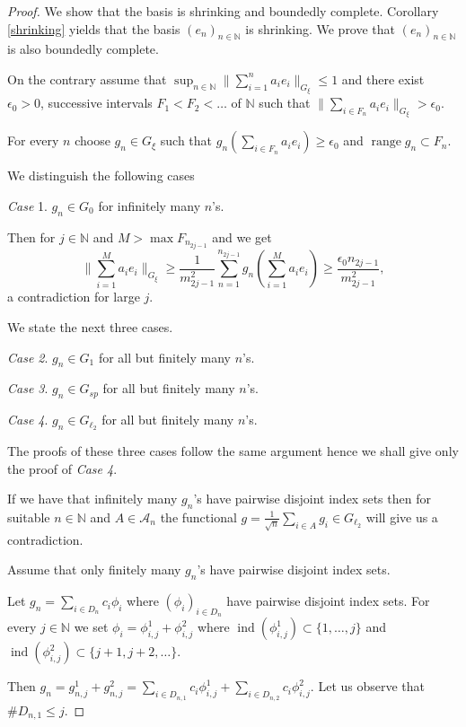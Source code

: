 \documentclass[a4paper]{amsart}
\theoremstyle{plain}
\newcommand{\N}{\mathbb{N}}
\newcommand{\mc}{\mathcal}
\newcommand{\e}{\epsilon}
\newcommand{\norm}[1][\cdot]{\lVert #1\rVert}
\DeclareMathOperator{\ran}{range}
\DeclareMathOperator{\ind}{ind}
\begin{document}
\begin{proof}
We show that the basis is shrinking and boundedly complete.
Corollary \ref{shrinking} yields that the basis $(e_{n})_{n\in\N}$
is shrinking. We  prove that $(e_{n})_{n\in\N}$  is also
boundedly complete.


On the contrary assume that
$\sup_{n\in\N}\norm[\sum_{i=1}^{n}a_{i}e_{i}]_{G_\xi}\leq 1$ and there exist $\e_0>0$,
successive intervals $F_{1}<F_{2}<\dots$ of   $\N$ such that  $\norm[\sum_{i\in
F_{n}}a_{i}e_{i}]_{G_\xi}> \e_0$.

For every $n$ choose $g_{n}\in G_{\xi}$ such that  $g_{n}(\sum_{i\in
F_{n}}a_{i}e_{i})\geq \e_0$ and  $\ran g_{n}\subset F_{n}$.

We distinguish the following cases

\textit{Case} 1. $g_{n}\in G_0$ for infinitely many $n$'s.

Then  for $j\in\N$ and $M>\max F_{n_{2j-1}}$ and  we get
$$
\|\sum_{i=1}^{M}a_{i}e_{i}\|_{G_\xi}\geq\frac{1}{m_{2j-1}^2}\sum_{n=1}^{n_{2j-1}}g_{n}(\sum_{i=1}^{M}a_{i}e_{i})\geq
\frac{\e_0 n_{2j-1}}{m^2_{2j-1}} ,
$$
a contradiction for large $j$.

We state the next three cases.

\textit{Case 2}. $g_{n}\in G_{1}$ for all but finitely many $n$'s.

\textit{Case 3}. $g_{n}\in G_{sp}$ for all but  finitely many $n$'s.

\textit{Case 4}. $g_{n}\in G_{\ell_2}$ for all but  finitely many $n$'s.

The proofs of these three  cases  follow the same argument hence we shall give only the  proof of \textit{Case 4}.

If we have that   infinitely many $g_{n}$'s have pairwise disjoint index sets then for
suitable $n\in\N$ and $A\in \mc{A}_{n}$ the functional $g=\frac{1}{\sqrt{n}}\sum_{i\in
A}g_{i}\in G_{\ell_2}$ will give us  a contradiction.

Assume that only finitely many $g_{n}$'s  have pairwise disjoint index sets.

Let $g_{n}=\sum_{i\in D_{n}}c_{i}\phi_{i}$ where $(\phi_{i})_{i\in D_{n}}$ have pairwise
disjoint index sets. For every $j\in\N$ we set $\phi_{i}=\phi_{i,j}^{1}+\phi_{i,j}^{2}$
where $\ind(\phi_{i,j}^{1})\subset\{1,\dots,j\}$ and
$\ind(\phi_{i,j}^{2})\subset\{j+1,j+2,\dots\}$.

Then $g_{n}=g_{n,j}^{1}+g_{n,j}^{2}=\sum_{i\in D_{n,1}}c_{i}\phi_{i,j}^{1}+\sum_{i\in
D_{n,2}}c_{i}\phi_{i,j}^{2}$. Let us observe that $\# D_{n,1}\leq j$.



\end{proof}
\end{document}

